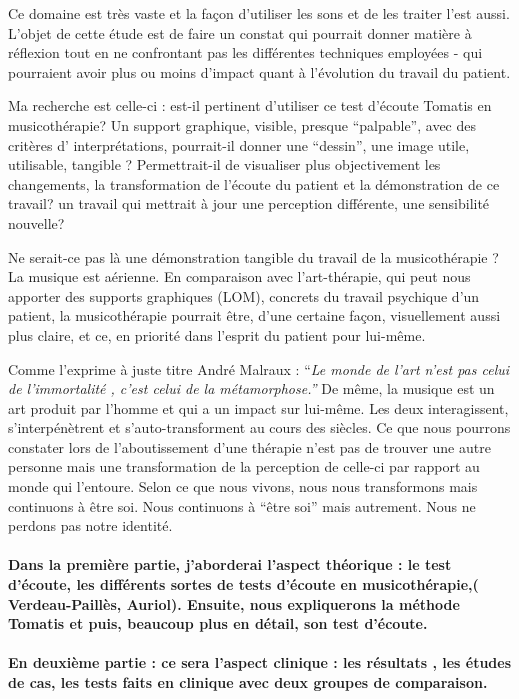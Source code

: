 \documentclass[12pt,french]{report}
\begin{document}
Ce domaine est très vaste et la façon d'utiliser les sons et de les
traiter l'est aussi. L'objet de cette étude est de faire un constat
qui pourrait donner matière à réflexion tout en ne confrontant pas
les différentes techniques employées - qui pourraient avoir plus ou
moins d'impact quant à l'évolution du travail du patient.

Ma recherche est celle-ci : est-il pertinent d'utiliser ce test d'écoute
Tomatis en musicothérapie? Un support graphique, visible, presque
``palpable'', avec des critères d' interprétations, pourrait-il
donner une ``dessin'', une image utile, utilisable, tangible ? Permettrait-il
de visualiser plus objectivement les changements, la transformation
de l'écoute du patient et la démonstration de ce travail? un travail
qui mettrait à jour une perception différente, une sensibilité nouvelle?

Ne serait-ce pas là une démonstration tangible du travail de la musicothérapie
? La musique est aérienne. En comparaison avec l'art-thérapie, qui
peut nous apporter des supports graphiques (LOM), concrets du travail psychique
d'un patient, la musicothérapie pourrait être, d'une certaine façon,
visuellement aussi plus claire, et ce, en priorité dans l'esprit du
patient pour lui-même. 

Comme l'exprime à juste titre André Malraux : ``\emph{Le monde de
l'art n'est pas celui de l'immortalité , c'est celui de la métamorphose.''}
De même, la musique est un art produit par l'homme et qui a un impact
sur lui-même. Les deux interagissent, s'interpénètrent et s'auto-transforment
au cours des siècles. Ce que nous pourrons constater lors de l'aboutissement
d'une thérapie n'est pas de trouver une autre personne mais une transformation
de la perception de celle-ci par rapport au monde qui l'entoure. Selon
ce que nous vivons, nous nous transformons mais continuons à être
soi. Nous continuons à ``être soi'' mais autrement. Nous ne perdons
pas notre identité.


\paragraph{{\tiny{\normalsize  Dans la première partie, j'aborderai l'aspect théorique : le test}}
d'écoute, les différents sortes de tests d'écoute en musicothérapie,(
Verdeau-Paillès, Auriol). Ensuite, nous expliquerons la méthode Tomatis
et puis, beaucoup plus en détail, son test d'écoute. }

\paragraph{En deuxième partie : ce sera l'aspect clinique : les résultats ,
les études de cas, les tests faits en clinique avec deux groupes de
comparaison.}
\end{document}
